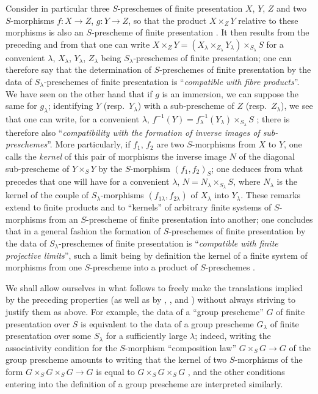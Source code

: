 \begin{env}[8.8.3]
Consider in particular three $S$-preschemes of finite presentation $X$, $Y$, $Z$ and two $S$-morphisms $f:X\to Z$, $g:Y\to Z$, so that the product $X\times_Z Y$ relative to these morphisms is also an $S$-prescheme of finite presentation .
It then results from the preceding and from  that one can write $X\times_Z Y=(X_\lambda\times_{Z_\lambda}Y_\lambda)\times_{S_\lambda}S$ for a convenient $\lambda$, $X_\lambda$, $Y_\lambda$, $Z_\lambda$ being $S_\lambda$-preschemes of finite presentation; one can therefore say that the determination of $S$-preschemes of finite presentation by the data of $S_\lambda$-preschemes of finite presentation is ``\emph{compatible with fibre products}''.
We have seen on the other hand  that if $g$ is an immersion, we can suppose the same for $g_\lambda$; identifying $Y$ (resp.\ $Y_\lambda$) with a sub-prescheme of $Z$ (resp.\ $Z_\lambda$), we see that one can write, for a convenient $\lambda$, $f^{-1}(Y)=f_\lambda^{-1}(Y_\lambda)\times_{S_\lambda}S$ ;
there is therefore also ``\emph{compatibility with the formation of inverse images of sub-preschemes}''.
More particularly, if $f_1$, $f_2$ are two $S$-morphisms from $X$ to $Y$, one calls the \emph{kernel} of this pair of morphisms the inverse image $N$ of the diagonal sub-prescheme of $Y\times_S Y$ by the $S$-morphism $(f_1,f_2)_S$; one deduces from what precedes that one will have for a convenient $\lambda$, $N=N_\lambda\times_{S_\lambda}S$, where $N_\lambda$ is the kernel of the couple of $S_\lambda$-morphisms $(f_{1\lambda},f_{2\lambda})$ of $X_\lambda$ into $Y_\lambda$.
These remarks extend to finite products and to ``kernels'' of arbitrary finite systems of $S$-morphisms from an $S$-prescheme of finite presentation into
another; one concludes that in a general fashion the formation of $S$-preschemes of finite presentation by the data of $S_\lambda$-preschemes of finite presentation is ``\emph{compatible with finite projective limits}'', such a limit being by definition the kernel of a finite system of morphisms from one $S$-prescheme into a product of $S$-preschemes .

We shall allow ourselves in what follows to freely make the translations implied by the preceding properties (as well as by , , and ) without always striving to justify them as above.
For example, the data of a ``group prescheme'' $G$ of finite presentation over $S$ is equivalent to the data of a group prescheme $G_\lambda$ of finite presentation over some $S_\lambda$ for a sufficiently large $\lambda$; indeed, writing the associativity condition for the $S$-morphism ``composition law'' $G\times_S G\to G$ of the group prescheme amounts to writing that the kernel of two $S$-morphisms of the form $G\times_S G\times_S G\to G$ is equal to $G\times_S G\times_S G$ , and the other conditions entering into the definition of a group prescheme are interpreted similarly.
\end{env}

